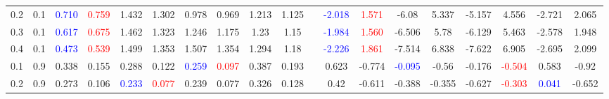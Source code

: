 \documentclass[specialist,
substylefile = spbu_report.rtx,
subf,href,colorlinks=true, 12pt]{disser}
\theoremstyle{definition}
\begin{document}
\begin{table}
{\begin{tabular}{m{1cm}m{1cm}ccccccccm{0.2cm}cccccccc}
			0.2 & 0.1    & \textcolor{blue}{0.710}                      & \textcolor{red}{0.759}                     & 1.432                                         & 1.302                       & 0.978                   & 0.969                                   & 1.213                                      & 1.125                    &                             & \textcolor{blue}{-2.018} & \textcolor{red}{1.571} & -6.08                    & 5.337                  & -5.157   & 4.556                   & -2.721                   & 2.065                   \\
			0.3 & 0.1    & \textcolor{blue}{0.617}                      & \textcolor{red}{0.675}                     & 1.462                                         & 1.323                       & 1.246                   & 1.175                                   & 1.23                                       & 1.15                     &                             & \textcolor{blue}{-1.984} & \textcolor{red}{1.560} & -6.506                   & 5.78                   & -6.129   & 5.463                   & -2.578                   & 1.948                   \\
			0.4 & 0.1    & \textcolor{blue}{0.473}                      & \textcolor{red}{0.539}                     & 1.499                                         & 1.353                       & 1.507                   & 1.354                                   & 1.294                                      & 1.18                     &                             & \textcolor{blue}{-2.226} & \textcolor{red}{1.861} & -7.514                   & 6.838                  & -7.622   & 6.905                   & -2.695                   & 2.099                   \\
			\hline
			0.1 & 0.9    & 0.338                                        & 0.155                                      & 0.288                                         & 0.122                       & \textcolor{blue}{0.259} & \textcolor{red}{0.097}                  & 0.387                                      & 0.193                    &                             & 0.623                    & -0.774                 & \textcolor{blue}{-0.095} & -0.56                  & -0.176   & \textcolor{red}{-0.504} & 0.583                    & -0.92                   \\
			0.2 & 0.9    & 0.273                                        & 0.106                                      & \textcolor{blue}{0.233}                       & \textcolor{red}{0.077}      & 0.239                   & 0.077                                   & 0.326                                      & 0.128                    &                             & 0.42                     & -0.611                 & -0.388                   & -0.355                 & -0.627   & \textcolor{red}{-0.303} & \textcolor{blue}{0.041}  & -0.652                  \\

\end{tabular}}
\end{table}
\end{document}
